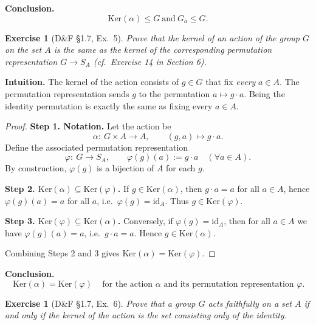 \documentclass[12pt]{article}
\newtheorem{exercise}[theorem]{Exercise}
\theoremstyle{definition}
\begin{document}
\noindent\textbf{Conclusion.}
\[
\boxed{\,\mathrm{Ker}(\alpha)\le G\ \text{and}\ G_a\le G.\,}
\]

\newpage

\begin{exercise}[D\&F §1.7, Ex.~5]
Prove that the kernel of an action of the group $G$ on the set $A$ is the same as the kernel
of the corresponding permutation representation $G \to S_A$ \textup{(cf.\ Exercise 14 in Section 6)}.
\end{exercise}

\dotfill

\noindent\textbf{Intuition.}
The kernel of the action consists of $g\in G$ that fix \emph{every} $a\in A$.
The permutation representation sends $g$ to the permutation $a\mapsto g\cdot a$.
Being the identity permutation is exactly the same as fixing every $a\in A$.

\dotfill

\begin{proof}
\noindent\textbf{Step 1. Notation.}
Let the action be
\[
\alpha:\ G\times A \longrightarrow A,\qquad (g,a)\longmapsto g\cdot a.
\]
Define the associated permutation representation
\[
\varphi:\ G \longrightarrow S_A,\qquad \varphi(g)(a):=g\cdot a\quad(\forall a\in A).
\]
By construction, $\varphi(g)$ is a bijection of $A$ for each $g$.

\smallskip
\noindent\textbf{Step 2. $\mathrm{Ker}(\alpha)\subseteq \mathrm{Ker}(\varphi)$.}
If $g\in \mathrm{Ker}(\alpha)$, then $g\cdot a=a$ for all $a\in A$, hence
$\varphi(g)(a)=a$ for all $a$, i.e.\ $\varphi(g)=\mathrm{id}_A$.
Thus $g\in \mathrm{Ker}(\varphi)$.

\smallskip
\noindent\textbf{Step 3. $\mathrm{Ker}(\varphi)\subseteq \mathrm{Ker}(\alpha)$.}
Conversely, if $\varphi(g)=\mathrm{id}_A$, then for all $a\in A$ we have
$\varphi(g)(a)=a$, i.e.\ $g\cdot a=a$. Hence $g\in \mathrm{Ker}(\alpha)$.

\smallskip
Combining Steps 2 and 3 gives $\mathrm{Ker}(\alpha)=\mathrm{Ker}(\varphi)$.
\end{proof}

\noindent\textbf{Conclusion.}
\[
\boxed{\,\mathrm{Ker}(\alpha)=\mathrm{Ker}(\varphi)\,}
\quad\text{for the action } \alpha \text{ and its permutation representation } \varphi.
\]

\newpage

\begin{exercise}[D\&F §1.7, Ex.~6]
Prove that a group $G$ acts faithfully on a set $A$ if and only if the kernel of the action
is the set consisting only of the identity.
\end{exercise}
\end{document}
